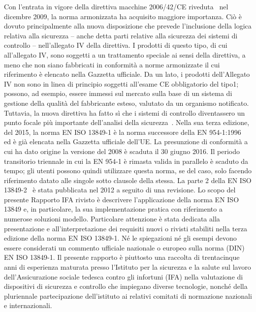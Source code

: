 Con l'entrata in vigore della direttiva macchine 2006/42/CE riveduta~\cite{dir2006-42-ce} nel dicembre 2009, la norma armonizzata ha acquisito maggiore importanza. Ciò è dovuto principalmente alla nuova disposizione che prevede l'inclusione della logica relativa alla sicurezza – anche detta parti relative alla sicurezza dei sistemi di controllo – nell'allegato IV della direttiva. I prodotti di questo tipo, di cui all'allegato IV, sono soggetti a un trattamento speciale ai sensi della direttiva, a meno che non siano fabbricati in conformità a norme armonizzate il cui riferimento è elencato nella Gazzetta ufficiale.
Da un lato, i prodotti dell'Allegato IV non sono in linea di principio soggetti all'esame CE obbligatorio del tipo1; possono, ad esempio, essere immessi sul mercato sulla base di un sistema di gestione della qualità del fabbricante esteso, valutato da un organismo notificato. Tuttavia, la nuova direttiva ha fatto sì che i sistemi di controllo diventassero un punto focale più importante dell'analisi della sicurezza~\cite{ostermann2007,reudenbach2007}.
Nella sua terza edizione, del 2015, la norma EN ISO 13849-1 è la norma successore della EN 954-1:1996~\cite{en954-1} ed è già elencata nella Gazzetta ufficiale dell'UE. La presunzione di conformità a cui ha dato origine la versione del 2008 è scaduta il 30 giugno 2016. Il periodo transitorio triennale in cui la EN 954-1 è rimasta valida in parallelo è scaduto da tempo; gli utenti possono quindi utilizzare questa norma, se del caso, solo facendo riferimento datato alle singole sotto clausole della stessa. La parte 2 della EN ISO 13849-2~\cite{eniso13849-2} è stata pubblicata nel 2012 a seguito di una revisione.
Lo scopo del presente Rapporto IFA rivisto è descrivere l'applicazione della norma EN ISO 13849 e, in particolare, la sua implementazione pratica con riferimento a numerose soluzioni modello. Particolare attenzione è stata dedicata alla presentazione e all'interpretazione dei requisiti nuovi o rivisti stabiliti nella terza edizione della norma EN ISO 13849-1. Né le spiegazioni né gli esempi devono essere considerati un commento ufficiale nazionale o europeo sulla norma (DIN) EN ISO 13849-1. Il presente rapporto è piuttosto una raccolta di trentacinque anni di esperienza maturata presso l'Istituto per la sicurezza e la salute sul lavoro dell'Assicurazione sociale tedesca contro gli infortuni (IFA) nella valutazione di dispositivi di sicurezza e controllo che impiegano diverse tecnologie, nonché della pluriennale partecipazione dell'istituto ai relativi comitati di normazione nazionali e internazionali.

